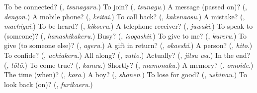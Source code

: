 \begin{tcolorbox}[breakable,colback=teal!4,colframe=teal!35!black,title={Before you move on}]
To be connected? (\textbf{}, \emph{tsunagaru}.) To join? (\textbf{}, \emph{tsunagu}.) A message (passed on)? (\textbf{}, \emph{dengon}.) A mobile phone? (\textbf{}, \emph{keitai}.) To call back? (\textbf{}, \emph{kakenaosu}.) A mistake? (\textbf{}, \emph{machigai}.) To be heard? (\textbf{}, \emph{kikoeru}.) A telephone receiver? (\textbf{}, \emph{juwaki}.) To speak to (someone)? (\textbf{}, \emph{hanashikakeru}.) Busy? (\textbf{}, \emph{isogashii}.) To give to me? (\textbf{}, \emph{kureru}.) To give (to someone else)? (\textbf{}, \emph{ageru}.) A gift in return? (\textbf{}, \emph{okaeshi}.) A person? (\textbf{}, \emph{hito}.) To confide? (\textbf{}, \emph{uchiakeru}.) All along? (\textbf{}, \emph{zutto}.) Actually? (\textbf{}, \emph{jitsu wa}.) In the end? (\textbf{}, \emph{tōtō}.) To come true? (\textbf{}, \emph{kanau}.) Shortly? (\textbf{}, \emph{mamonaku}.) A memory? (\textbf{}, \emph{omoide}.) The time (when)? (\textbf{}, \emph{koro}.) A boy? (\textbf{}, \emph{shōnen}.) To lose for good? (\textbf{}, \emph{ushinau}.) To look back (on)? (\textbf{}, \emph{furikaeru}.)
\end{tcolorbox}
